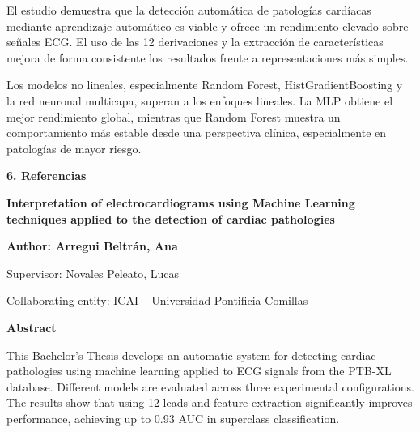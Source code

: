 \documentclass[12pt,a4paper,twoside]{book}
\begin{document}
El estudio demuestra que la detección automática de patologías cardíacas mediante aprendizaje automático es viable y ofrece un rendimiento elevado sobre señales ECG. 
El uso de las 12 derivaciones y la extracción de características mejora de forma consistente los resultados frente a representaciones más simples.

Los modelos no lineales, especialmente Random Forest, HistGradientBoosting y la red neuronal multicapa, superan a los enfoques lineales. 
La MLP obtiene el mejor rendimiento global, mientras que Random Forest muestra un comportamiento más estable desde una perspectiva clínica, especialmente en patologías de mayor riesgo.
\vspace{0.5cm}

\noindent \large \textbf{6. Referencias}
\vspace{0.3cm}

\begin{refsection}

\nocite{ptbxl_dataset,hannun2019arrhythmia,ayano2022ecg_ml_review,kalmady2024ecg_cv,esc_ai_ecg_diagnostics}

\printbibliography[heading=none]
\end{refsection}

\newpage


	
\noindent \textbf{Interpretation of electrocardiograms using Machine Learning techniques applied to the detection of cardiac pathologies}

\vspace{0.3cm}

\noindent \textbf{Author: Arregui Beltrán, Ana}

\noindent Supervisor: Novales Peleato, Lucas

\noindent Collaborating entity: ICAI -- Universidad Pontificia Comillas

\vspace{0.3cm}

\noindent \large \textbf{Abstract}
\vspace{0.3cm}

This Bachelor's Thesis develops an automatic system for detecting cardiac pathologies using machine learning applied to ECG signals from the PTB-XL database. 
Different models are evaluated across three experimental configurations. 
The results show that using 12 leads and feature extraction significantly improves performance, achieving up to 0.93 AUC in superclass classification.
\vspace{0.3cm}
\end{document}
